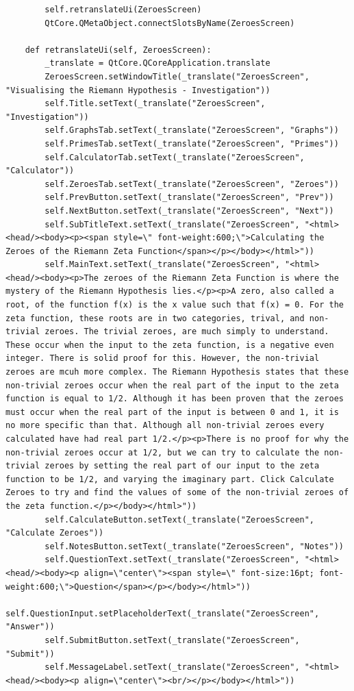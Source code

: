 \documentclass{article}
\begin{document}
\begin{lstlisting}
        self.retranslateUi(ZeroesScreen)
        QtCore.QMetaObject.connectSlotsByName(ZeroesScreen)

    def retranslateUi(self, ZeroesScreen):
        _translate = QtCore.QCoreApplication.translate
        ZeroesScreen.setWindowTitle(_translate("ZeroesScreen", "Visualising the Riemann Hypothesis - Investigation"))
        self.Title.setText(_translate("ZeroesScreen", "Investigation"))
        self.GraphsTab.setText(_translate("ZeroesScreen", "Graphs"))
        self.PrimesTab.setText(_translate("ZeroesScreen", "Primes"))
        self.CalculatorTab.setText(_translate("ZeroesScreen", "Calculator"))
        self.ZeroesTab.setText(_translate("ZeroesScreen", "Zeroes"))
        self.PrevButton.setText(_translate("ZeroesScreen", "Prev"))
        self.NextButton.setText(_translate("ZeroesScreen", "Next"))
        self.SubTitleText.setText(_translate("ZeroesScreen", "<html><head/><body><p><span style=\" font-weight:600;\">Calculating the Zeroes of the Riemann Zeta Function</span></p></body></html>"))
        self.MainText.setText(_translate("ZeroesScreen", "<html><head/><body><p>The zeroes of the Riemann Zeta Function is where the mystery of the Riemann Hypothesis lies.</p><p>A zero, also called a root, of the function f(x) is the x value such that f(x) = 0. For the zeta function, these roots are in two categories, trival, and non-trivial zeroes. The trivial zeroes, are much simply to understand. These occur when the input to the zeta function, is a negative even integer. There is solid proof for this. However, the non-trivial zeroes are mcuh more complex. The Riemann Hypothesis states that these non-trivial zeroes occur when the real part of the input to the zeta function is equal to 1/2. Although it has been proven that the zeroes must occur when the real part of the input is between 0 and 1, it is no more specific than that. Although all non-trivial zeroes every calculated have had real part 1/2.</p><p>There is no proof for why the non-trivial zeroes occur at 1/2, but we can try to calculate the non-trivial zeroes by setting the real part of our input to the zeta function to be 1/2, and varying the imaginary part. Click Calculate Zeroes to try and find the values of some of the non-trivial zeroes of the zeta function.</p></body></html>"))
        self.CalculateButton.setText(_translate("ZeroesScreen", "Calculate Zeroes"))
        self.NotesButton.setText(_translate("ZeroesScreen", "Notes"))
        self.QuestionText.setText(_translate("ZeroesScreen", "<html><head/><body><p align=\"center\"><span style=\" font-size:16pt; font-weight:600;\">Question</span></p></body></html>"))
        self.QuestionInput.setPlaceholderText(_translate("ZeroesScreen", "Answer"))
        self.SubmitButton.setText(_translate("ZeroesScreen", "Submit"))
        self.MessageLabel.setText(_translate("ZeroesScreen", "<html><head/><body><p align=\"center\"><br/></p></body></html>"))
\end{lstlisting}
\end{document}

